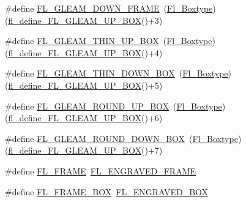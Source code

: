\begin{DoxyCompactItemize}
\item 
\#define \hyperlink{_enumerations_8_h_ae467bf27a6946e7598ecd88f294d2efd}{F\+L\+\_\+\+G\+L\+E\+A\+M\+\_\+\+D\+O\+W\+N\+\_\+\+F\+R\+A\+ME}~(\hyperlink{_enumerations_8_h_ae48bf9070f8541de17829f54ccacc6bc}{Fl\+\_\+\+Boxtype})(\hyperlink{_enumerations_8_h_a85391cadfdf4d449af50dc66d2d3c1af}{fl\+\_\+define\+\_\+\+F\+L\+\_\+\+G\+L\+E\+A\+M\+\_\+\+U\+P\+\_\+\+B\+OX}()+3)
\item 
\#define \hyperlink{_enumerations_8_h_aefc2da5a8c9009700dcfd638561e6aac}{F\+L\+\_\+\+G\+L\+E\+A\+M\+\_\+\+T\+H\+I\+N\+\_\+\+U\+P\+\_\+\+B\+OX}~(\hyperlink{_enumerations_8_h_ae48bf9070f8541de17829f54ccacc6bc}{Fl\+\_\+\+Boxtype})(\hyperlink{_enumerations_8_h_a85391cadfdf4d449af50dc66d2d3c1af}{fl\+\_\+define\+\_\+\+F\+L\+\_\+\+G\+L\+E\+A\+M\+\_\+\+U\+P\+\_\+\+B\+OX}()+4)
\item 
\#define \hyperlink{_enumerations_8_h_a18648039f4badc3bab9f97d144a5ce40}{F\+L\+\_\+\+G\+L\+E\+A\+M\+\_\+\+T\+H\+I\+N\+\_\+\+D\+O\+W\+N\+\_\+\+B\+OX}~(\hyperlink{_enumerations_8_h_ae48bf9070f8541de17829f54ccacc6bc}{Fl\+\_\+\+Boxtype})(\hyperlink{_enumerations_8_h_a85391cadfdf4d449af50dc66d2d3c1af}{fl\+\_\+define\+\_\+\+F\+L\+\_\+\+G\+L\+E\+A\+M\+\_\+\+U\+P\+\_\+\+B\+OX}()+5)
\item 
\#define \hyperlink{_enumerations_8_h_a06897dd7e14889699ea8ca6b75755385}{F\+L\+\_\+\+G\+L\+E\+A\+M\+\_\+\+R\+O\+U\+N\+D\+\_\+\+U\+P\+\_\+\+B\+OX}~(\hyperlink{_enumerations_8_h_ae48bf9070f8541de17829f54ccacc6bc}{Fl\+\_\+\+Boxtype})(\hyperlink{_enumerations_8_h_a85391cadfdf4d449af50dc66d2d3c1af}{fl\+\_\+define\+\_\+\+F\+L\+\_\+\+G\+L\+E\+A\+M\+\_\+\+U\+P\+\_\+\+B\+OX}()+6)
\item 
\#define \hyperlink{_enumerations_8_h_add90f42e02947c4be12409786bda2789}{F\+L\+\_\+\+G\+L\+E\+A\+M\+\_\+\+R\+O\+U\+N\+D\+\_\+\+D\+O\+W\+N\+\_\+\+B\+OX}~(\hyperlink{_enumerations_8_h_ae48bf9070f8541de17829f54ccacc6bc}{Fl\+\_\+\+Boxtype})(\hyperlink{_enumerations_8_h_a85391cadfdf4d449af50dc66d2d3c1af}{fl\+\_\+define\+\_\+\+F\+L\+\_\+\+G\+L\+E\+A\+M\+\_\+\+U\+P\+\_\+\+B\+OX}()+7)
\item 
\#define \hyperlink{_enumerations_8_h_a17efe847a8cb25574f629cb5c761c94e}{F\+L\+\_\+\+F\+R\+A\+ME}~\hyperlink{_enumerations_8_h_ae48bf9070f8541de17829f54ccacc6bca991b75017b74f2238309ac842b0174dd}{F\+L\+\_\+\+E\+N\+G\+R\+A\+V\+E\+D\+\_\+\+F\+R\+A\+ME}
\item 
\#define \hyperlink{_enumerations_8_h_a7024b601032a8da947f10b618896cfca}{F\+L\+\_\+\+F\+R\+A\+M\+E\+\_\+\+B\+OX}~\hyperlink{_enumerations_8_h_ae48bf9070f8541de17829f54ccacc6bcac0235da7fe5bb34f32718b04dee0500d}{F\+L\+\_\+\+E\+N\+G\+R\+A\+V\+E\+D\+\_\+\+B\+OX}

\end{DoxyCompactItemize}
